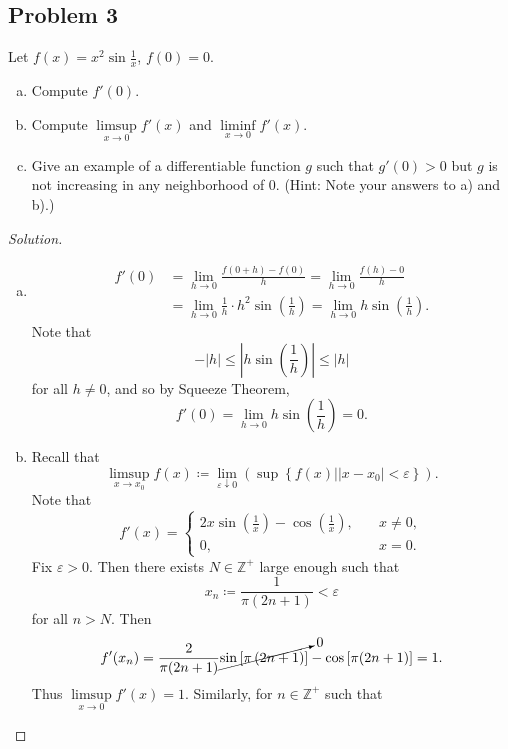 \documentclass[12pt]{article}
\newcommand{\z}{\mathbb{Z}}
\newcommand\paren[1]{\left( #1 \right)}
\newcommand\setb[1]{\left \{ #1 \right \}}
\newcommand{\sqbrack}[1]{\left [ #1 \right ]}
\newcommand{\eps}{\varepsilon}
\theoremstyle{definition}
\begin{document}
\subsection{Problem 3}
Let $\displaystyle f(x) = x^2 \sin \frac{1}{x}$, $f(0) = 0$.
\begin{enumerate}[(a)]
    \item Compute $f'(0)$.
    \item Compute $\limsup\limits_{x \to 0} f'(x)$ and $\liminf\limits_{x \to 0} f'(x)$.
    \item Give an example of a differentiable function $g$ such that $g'(0) > 0$ but $g$ is not increasing in any neighborhood of 0. (Hint: Note your answers to a) and b).)
\end{enumerate}
\begin{proof}[Solution]
    \noindent
    \begin{enumerate}[(a)]
        \item 
        \begin{align*}
            f'(0) & = \lim\limits_{h \to 0} \frac{f(0 + h) - f(0)}{h} = \lim\limits_{h \to 0} \frac{f(h) - 0}{h} \\
            & = \lim\limits_{h \to 0} \frac{1}{h} \cdot h^2 \sin \paren{ \frac{1}{h} } = \lim\limits_{h \to 0} h \sin \paren{ \frac{1}{h} }.
        \end{align*}
        Note that 
        \[
            -|h| \leq \left| h \sin \paren{ \frac{1}{h} } \right| \leq |h|
        \]
        for all $h \neq 0$, and so by Squeeze Theorem,
        \[
            f'(0) = \lim\limits_{h \to 0} h \sin \paren{ \frac{1}{h} } = 0.
        \]
        \item Recall that 
        \[
            \limsup\limits_{x \to x_0} f(x) \coloneqq \lim\limits_{\eps \downarrow 0} \paren{ \sup \setb{ f(x) | |x-x_0| < \eps } }.
        \]
        Note that 
        \[
            f'(x) = 
            \begin{cases}
                2x \sin \paren{ \frac{1}{x} } - \cos \paren{ \frac{1}{x} } , & \quad x \neq 0, \\
                0 , & \quad x = 0.
            \end{cases}
        \]
        Fix $\eps > 0$. Then there exists $N \in \z^+$ large enough such that 
        \[
            x_n \coloneqq \frac{1}{\pi(2n+1)} < \eps
        \]
        for all $n > N$. Then 
        \[
            f'(x_n) = \frac{2}{\pi(2n+1)} \cancelto{0}{ \sin \sqbrack{ \pi \paren{ 2n+1 } } } - \cos \sqbrack{\pi(2n+1)} = 1.
        \]
        Thus $\limsup\limits_{x \to 0} f'(x) = 1$. Similarly, for $n \in \z^+$ such that 

\end{enumerate}
\end{proof}
\end{document}
